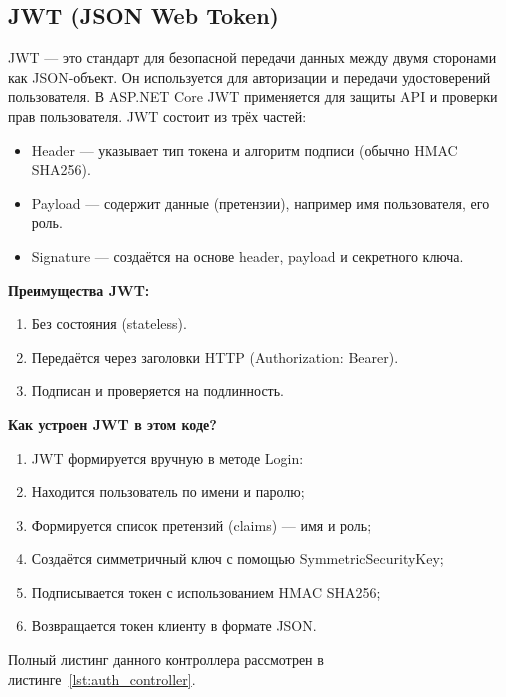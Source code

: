 \documentclass[12pt]{article}
\renewcommand{\texttt}[1]{{\small\ttfamily #1}}
\numberwithin{listing}{section}
\numberwithin{figure}{section}
\begin{document}
\subsection{JWT (JSON Web Token)}
JWT — это стандарт для безопасной передачи данных между двумя сторонами как JSON-объект. Он используется для авторизации и передачи удостоверений пользователя. В ASP.NET Core JWT применяется для защиты API и проверки прав пользователя.
JWT состоит из трёх частей:
\begin{itemize}
	\item Header — указывает тип токена и алгоритм подписи (обычно HMAC SHA256).
	\item Payload — содержит данные (претензии), например имя пользователя, его роль.
	\item Signature — создаётся на основе header, payload и секретного ключа.
\end{itemize}
\textbf{Преимущества JWT:}
\begin{enumerate}
	\item Без состояния (stateless).
	\item Передаётся через заголовки HTTP (Authorization: Bearer).
	\item Подписан и проверяется на подлинность.
\end{enumerate}
\textbf{Как устроен JWT в этом коде?}
\begin{enumerate}
	\item JWT формируется вручную в методе Login:
	\item Находится пользователь по имени и паролю;
	\item Формируется список претензий (claims) — имя и роль;
	\item Создаётся симметричный ключ с помощью \texttt{SymmetricSecurityKey};
	\item Подписывается токен с использованием HMAC SHA256;
	\item Возвращается токен клиенту в формате JSON.
\end{enumerate}
Полный листинг данного контроллера рассмотрен в листинге~\ref{lst:auth_controller}.
\end{document}
